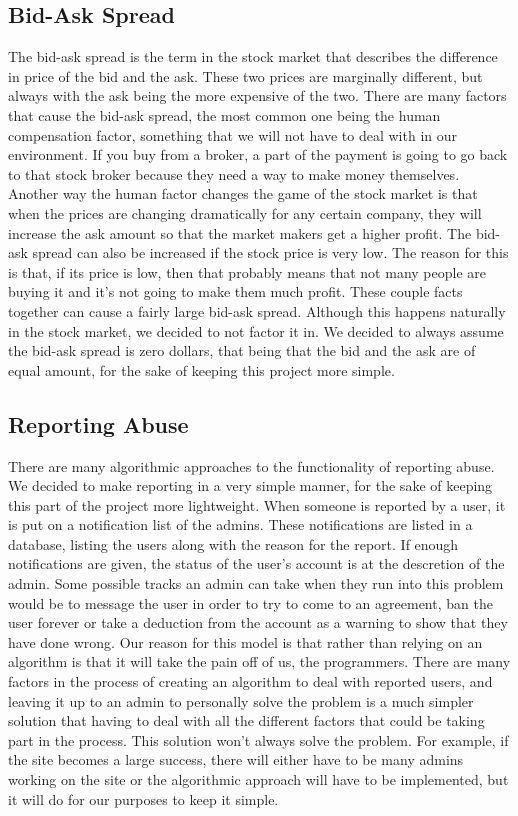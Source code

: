 \subsection{Bid-Ask Spread}

The bid-ask spread is the term in the stock market that describes the difference in price of the bid and the ask. These two prices are marginally different, but always with the ask being the more expensive of the two.\cite{inv:bidask} There are many factors that cause the bid-ask spread, the most common one being the human compensation factor, something that we will not have to deal with in our environment. If you buy from a broker, a part of the payment is going to go back to that stock broker because they need a way to make money themselves.\cite{inv:spreaddet} Another way the human factor changes the game of the stock market is that when the prices are changing dramatically for any certain company, they will increase the ask amount so that the market makers get a higher profit. The bid-ask spread can also be increased if the stock price is very low. The reason for this is that, if its price is low, then that probably means that not many people are buying it and it's not going to make them much profit. These couple facts together can cause a fairly large bid-ask spread. Although this happens naturally in the stock market, we decided to not factor it in. We decided to always assume the bid-ask spread is zero dollars, that being that the bid and the ask are of equal amount, for the sake of keeping this project more simple. 

\subsection{Reporting Abuse}

There are many algorithmic approaches to the functionality of reporting abuse. We decided to make reporting in a very simple manner, for the sake of keeping this part of the project more lightweight. When someone is reported by a user, it is put on a notification list of the admins. These notifications are listed in a database, listing the users along with the reason for the report. If enough notifications are given, the status of the user's account is at the descretion of the admin. Some possible tracks an admin can take when they run into this problem would be to message the user in order to try to come to an agreement, ban the user forever or take a deduction from the account as a warning to show that they have done wrong. Our reason for this model is that rather than relying on an algorithm is that it will take the pain off of us, the programmers. There are many factors in the process of creating an algorithm to deal with reported users, and leaving it up to an admin to personally solve the problem is a much simpler solution that having to deal with all the different factors that could be taking part in the process. This solution won't always solve the problem. For example, if the site becomes a large success, there will either have to be many admins working on the site or the algorithmic approach will have to be implemented, but it will do for our purposes to keep it simple.

